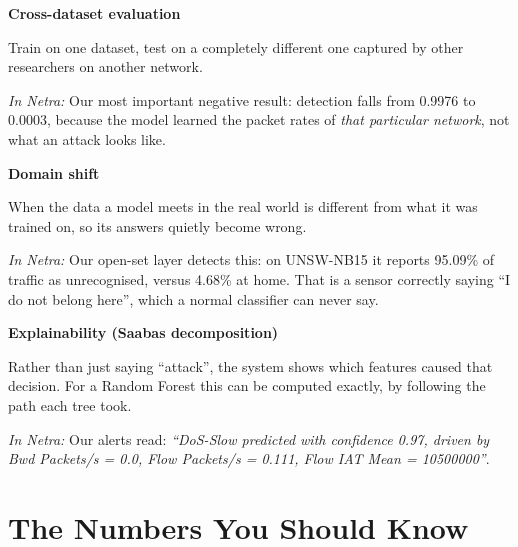 \documentclass[11pt,a4paper]{article}
\newcommand{\term}[3]{%
  \par\medskip\noindent\textbf{\color{ink}#1}\par
  \nobreak\vspace{1pt}#2\par
  \nobreak\vspace{1pt}\textit{\color{accent}In Netra:} #3\par}
\begin{document}
\term{Cross-dataset evaluation}
{Train on one dataset, test on a completely different one captured by other
researchers on another network.}
{Our most important negative result: detection falls from 0.9976 to 0.0003,
because the model learned the packet rates of \emph{that particular network},
not what an attack looks like.}

\term{Domain shift}
{When the data a model meets in the real world is different from what it was
trained on, so its answers quietly become wrong.}
{Our open-set layer detects this: on UNSW-NB15 it reports 95.09\% of traffic as
unrecognised, versus 4.68\% at home. That is a sensor correctly saying ``I do not
belong here'', which a normal classifier can never say.}

\term{Explainability (Saabas decomposition)}
{Rather than just saying ``attack'', the system shows which features caused that
decision. For a Random Forest this can be computed exactly, by following the path
each tree took.}
{Our alerts read: \emph{``DoS-Slow predicted with confidence 0.97, driven by
Bwd Packets/s = 0.0, Flow Packets/s = 0.111, Flow IAT Mean = 10500000''}.}

\section{The Numbers You Should Know}
\end{document}
